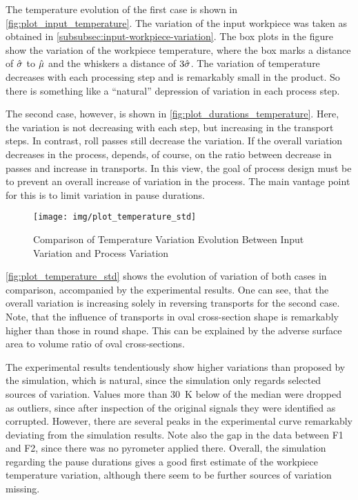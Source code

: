 The temperature evolution of the first case is shown in \autoref{fig:plot_input_temperature}.
The variation of the input workpiece was taken as obtained in \autoref{subsubsec:input-workpiece-variation}.
The box plots in the figure show the variation of the workpiece temperature, where the box marks a distance of ${\hat{{\sigma}}}$ to ${\hat{{\mu}}}$ and the whiskers a distance of $3{\hat{{\sigma}}}$.
The variation of temperature decreases with each processing step and is remarkably small in the product.
So there is something like a ``natural'' depression of variation in each process step.

The second case, however, is shown in \autoref{fig:plot_durations_temperature}.
Here, the variation is not decreasing with each step, but increasing in the transport steps.
In contrast, roll passes still decrease the variation.
If the overall variation decreases in the process, depends, of course, on the ratio between decrease in passes and increase in transports.
In this view, the goal of process design must be to prevent an overall increase of variation in the process.
The main vantage point for this is to limit variation in pause durations.

\begin{figure}
    \centering
    \texttt{[image: img/plot\_temperature\_std]}
    \caption{Comparison of Temperature Variation Evolution Between Input Variation and Process Variation}
    \label{fig:plot_temperature_std}
\end{figure}

\autoref{fig:plot_temperature_std} shows the evolution of variation of both cases in comparison, accompanied by the experimental results.
One can see, that the overall variation is increasing solely in reversing transports for the second case.
Note, that the influence of transports in oval cross-section shape is remarkably higher than those in round shape.
This can be explained by the adverse surface area to volume ratio of oval cross-sections.

The experimental results tendentiously show higher variations than proposed by the simulation, which is natural, since the simulation only regards selected sources of variation.
Values more than \qty{30}{\kelvin} below of the median were dropped as outliers, since after inspection of the original signals they were identified as corrupted.
However, there are several peaks in the experimental curve remarkably deviating from the simulation results.
Note also the gap in the data between F1 and F2, since there was no pyrometer applied there.
Overall, the simulation regarding the pause durations gives a good first estimate of the workpiece temperature variation, although there seem to be further sources of variation missing.

